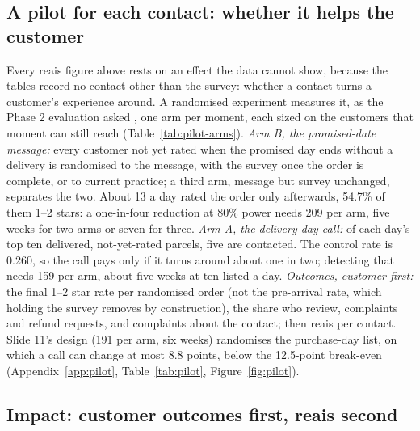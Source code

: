 \subsection{A pilot for each contact: whether it helps the customer}
\label{sec:pilot}

Every reais figure above rests on an effect the data cannot show, because the
tables record no contact other than the survey: whether a contact turns a
customer's experience around. A randomised experiment measures it, as the
Phase 2 evaluation asked \citep{kohavi2009controlled}, one arm per moment, each
sized on the customers that moment can still reach (Table~\ref{tab:pilot-arms}).
\emph{Arm B, the promised-date message:} every customer not yet rated when the
promised day ends without a delivery is randomised to the message, with the survey once the order
is complete, or to current practice; a third arm, message but survey unchanged,
separates the two. About 13 a day rated the order only afterwards,
54.7\% of them 1--2 stars: a one-in-four reduction at 80\% power
needs 209 per arm, five weeks for two arms or seven for three. \emph{Arm A, the
delivery-day call:} of each day's top ten delivered, not-yet-rated parcels, five
are contacted. The control rate is 0.260, so the call pays only if it turns
around about one in two; detecting that needs 159 per arm, about five weeks at
ten listed a day. \emph{Outcomes, customer first:} the final 1--2 star rate per
randomised order (not the pre-arrival rate, which holding the survey removes by
construction), the share who review, complaints and refund requests, and
complaints about the contact; then reais per contact. Slide 11's design (191 per
arm, six weeks) randomises the purchase-day list, on which a call can change at
most 8.8 points, below the 12.5-point break-even (Appendix~\ref{app:pilot},
Table~\ref{tab:pilot}, Figure~\ref{fig:pilot}).

\subsection{Impact: customer outcomes first, reais second}

